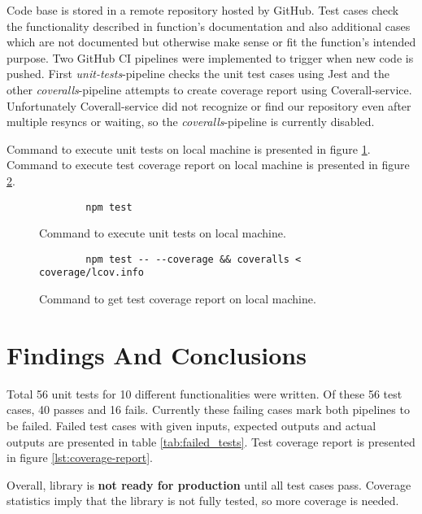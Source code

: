 \documentclass[]{article}
\begin{document}
Code base is stored in a remote repository hosted by GitHub.
Test cases check the functionality described in function's documentation and also additional cases which are not documented but otherwise make sense or fit the function's intended purpose.
Two GitHub CI pipelines were implemented to trigger when new code is pushed.
First \textit{unit-tests}-pipeline checks the unit test cases using Jest and the other \textit{coveralls}-pipeline attempts to create coverage report using Coverall-service.
Unfortunately Coverall-service did not recognize or find our repository even after multiple resyncs or waiting, so the \textit{coveralls}-pipeline is currently disabled.

Command to execute unit tests on local machine is presented in figure \ref{lst:execute_tests}.
Command to execute test coverage report on local machine is presented in figure \ref{lst:execute_coverage}.

\begin{figure}[H]
	\centering
	\begin{lstlisting}
		npm test
	\end{lstlisting}
	\caption{Command to execute unit tests on local machine.}
	\label{lst:execute_tests}
\end{figure}

\begin{figure}[H]
	\centering
	\begin{lstlisting}
		npm test -- --coverage && coveralls < coverage/lcov.info
	\end{lstlisting}
	\caption{Command to get test coverage report on local machine.}
	\label{lst:execute_coverage}
\end{figure}

\newpage
\section{Findings And Conclusions}

Total 56 unit tests for 10 different functionalities were written.
Of these 56 test cases, 40 passes and 16 fails.
Currently these failing cases mark both pipelines to be failed.
Failed test cases with given inputs, expected outputs and actual outputs are presented in table \ref{tab:failed_tests}.
Test coverage report is presented in figure \ref{lst:coverage-report}.

Overall, library is \textbf{not ready for production} until all test cases pass.
Coverage statistics imply that the library is not fully tested, so more coverage is needed.
\end{document}
